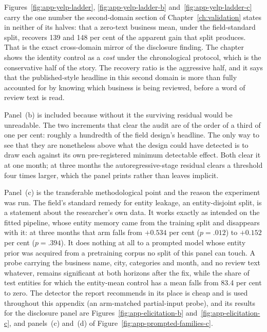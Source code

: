 Figures~\ref{fig:app-yelp-ladder}, \ref{fig:app-yelp-ladder-b} and~\ref{fig:app-yelp-ladder-c} carry the one number the second-domain
section of Chapter~\ref{ch:validation} states in neither of its halves: that a
zero-text business mean, under the field-standard split, recovers 139 and 148
per cent of the apparent gain that split produces. That is the exact
cross-domain mirror of the disclosure finding. The chapter shows the identity
control as a \emph{cost} under the chronological protocol, which is the
conservative half of the story. The recovery ratio is the aggressive half, and
it says that the published-style headline in this second domain is more than
fully accounted for by knowing which business is being reviewed, before a word
of review text is read.

Panel~(b) is included because without it the surviving residual would be
unreadable. The two increments that clear the audit are of the order of a
third of one per cent: roughly a hundredth of the field design's headline.
The only way to see that they are nonetheless above what the design
could have detected is to draw each against its own pre-registered minimum
detectable effect. Both clear it at one month; at three months the
autoregressive-stage residual clears a threshold four times larger, which the
panel prints rather than leaves implicit.

Panel~(c) is the transferable methodological point and the reason the
experiment was run. The field's standard remedy for entity leakage, an
entity-disjoint split, is a statement about the researcher's own data. It
works exactly as intended on the fitted pipeline, whose entity memory came
from the training split and disappears with it: at three months that arm falls
from $+0.534$ per cent ($p=.012$) to $+0.152$ per cent ($p=.394$). It does
nothing at all to a prompted model whose entity prior was acquired from a
pretraining corpus no split of this panel can touch. A probe carrying the
business name, city, categories and month, and no review text whatever,
remains significant at both horizons after the fix, while the share of test
entities for which the entity-mean control has a mean falls from 83.4 per cent
to zero. %
The detector the report recommends in its place is cheap and is used
throughout this appendix (an arm-matched partial-input probe), and its
results for the disclosure panel are
Figures~\ref{fig:app-elicitation-b} and~\ref{fig:app-elicitation-c},
and panels~(c) and~(d) of Figure~\ref{fig:app-prompted-families-c}.

